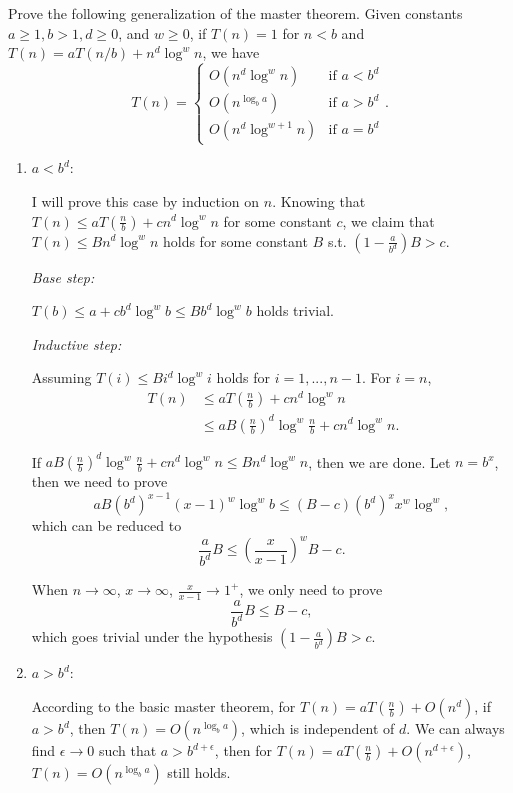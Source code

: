 \documentclass{oxmathproblems}
\begin{document}
\begin{questions}

\miquestion[25]
Prove the following generalization of the master theorem. Given constants $a\geq 1,b> 1,d\geq 0$, and $w\geq 0$, if $T(n)=1$ for $n<b$ and $T(n) = aT(n/b) + n^d\log^w n$, we have
  $$
    T(n) = \begin{cases}
      O(n^d\log^w n) & \mbox{if }a < b^d \\
      O(n^{\log_b a}) & \mbox{if }a > b^d \\
      O(n^d\log^{w+1} n) & \mbox{if }a = b^d
    \end{cases}.
  $$

\begin{Solution}  
\begin{enumerate}
    \item $a<b^d$:  

    I will prove this case by induction on $n$. Knowing that $T(n)\leq aT(\frac{n}{b})+cn^d \log^w n$ for some constant $c$, we claim that $T(n)\leq Bn^d \log^w n$ holds for some constant $B$ s.t. $(1-\frac{a}{b^d})B > c$.  

    \emph{Base step:} 
    
    $T(b)\leq a+cb^d\log^w b\leq Bb^d\log^w b$ holds trivial.

    \emph{Inductive step:}
    
    Assuming $T(i)\leq Bi^d\log^w i$ holds for $i=1,...,n-1$.
    For $i=n$, \begin{align*}\
        T(n) &\leq aT(\frac{n}{b})+cn^d \log^w n \\
        &\leq aB(\frac{n}{b})^d\log^w \frac{n}{b}+cn^d\log^w n.
    \end{align*}

    If $aB(\frac{n}{b})^d\log^w \frac{n}{b}+cn^d\log^w n \leq Bn^d \log^w n$, then we are done.
    Let $n=b^x$, then we need to prove $$aB(b^d)^{x-1}(x-1)^w\log^w b \leq (B-c)(b^d)^x x^w \log^w,$$ which can be reduced to$$\frac{a}{b^d}B\leq(\frac{x}{x-1})^wB-c.$$
    
    When $n\rightarrow \infty$, $x\rightarrow \infty$, $\frac{x}{x-1}\rightarrow 1^+$, we only need to prove $$\frac{a}{b^d}B\leq B-c,$$ which goes trivial under the hypothesis $(1-\frac{a}{b^d})B > c$.
    
    \item $a>b^d$:
    
    According to the basic master theorem, for $T(n)=a T(\frac{n}{b})+O(n^d)$, if $a>b^d$, then $T(n)=O(n^{\log_b a})$, which is independent of $d$. We can always find $\epsilon \rightarrow 0$ such that $a>b^{d+\epsilon}$, then for $T(n)=a T(\frac{n}{b})+O(n^{d+\epsilon})$, $T(n)=O(n^{\log_b a})$ still holds.  
    

\end{enumerate}
\end{Solution}
\end{questions}
\end{document}
